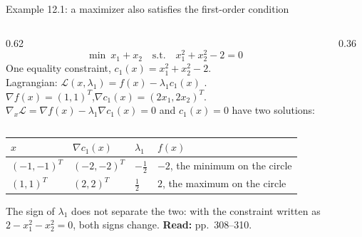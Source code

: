 \documentclass[aspectratio=169,12pt]{beamer}
\newcommand{\gradf}{\nabla f}
\newcommand{\eqn}[1]{\text{\small(#1)}}
\newcommand{\readbook}[1]{{\color{red}\textbf{Read:} #1}}
\newcommand{\cL}{\mathcal{L}}
\begin{document}
\begin{frame}{Example 12.1: a maximizer also satisfies the first-order condition}
  \begin{columns}[T,totalwidth=\textwidth]
    \begin{column}{0.62\textwidth}
      \[ \min\ x_{1}+x_{2}\quad\text{s.t.}\quad x_{1}^{2}+x_{2}^{2}-2=0 \tag{12.9} \]
      One equality constraint, $c_{1}(x)=x_{1}^{2}+x_{2}^{2}-2$.\\
      Lagrangian: $\cL(x,\lambda_{1})=f(x)-\lambda_{1}c_{1}(x)$ \eqn{12.16}.\\[0.2em]
      $\gradf(x)=(1,1)^{T}$,\quad $\nabla c_{1}(x)=(2x_{1},2x_{2})^{T}$.\\[0.2em]
      $\nabla_{x}\cL=\gradf(x)-\lambda_{1}\nabla c_{1}(x)=0$ and $c_{1}(x)=0$ have two solutions:
    \end{column}
    \begin{column}{0.36\textwidth}
      \centering
    \end{column}
  \end{columns}
  \begin{center}\small\setlength\tabcolsep{8pt}
  \begin{tabular}{llll}
    \toprule
    $x$ & $\nabla c_{1}(x)$ & $\lambda_{1}$ & $f(x)$ \\
    \midrule
    $(-1,-1)^{T}$ & $(-2,-2)^{T}$ & $-\tfrac12$ & $-2$, the minimum on the circle \\
    $(1,1)^{T}$ & $(2,2)^{T}$ & $\tfrac12$ & $2$, the maximum on the circle \\
    \bottomrule
  \end{tabular}
  \end{center}
  The sign of $\lambda_{1}$ does not separate the two: with the constraint written as
  $2-x_{1}^{2}-x_{2}^{2}=0$, both signs change. \readbook{pp.~308--310.}
\end{frame}
\end{document}
